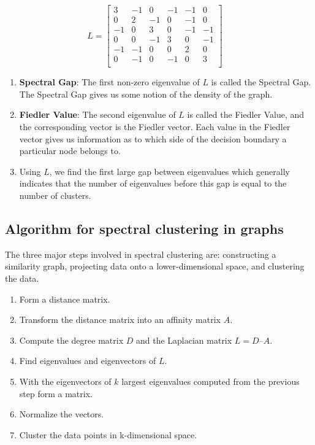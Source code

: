 \documentclass{article}
\begin{document}
        $$ L = 
    	\begin{bmatrix} 
    	3 & -1 & 0 & -1 & -1 & 0 \\
    	0 & 2 & -1 & 0 & -1 & 0 \\
    	-1 & 0 & 3 & 0 & -1 & -1 \\
     	0 & 0 & -1 & 3 & 0 & -1 \\
      	-1 & -1 & 0 & 0 & 2 & 0 \\
       	0 & -1 & 0 & -1 & 0 & 3 \\
    	\end{bmatrix}
    	\quad
        $$
        \begin{enumerate}
            \item \textbf{Spectral Gap}: The first non-zero eigenvalue of $L$ is called the Spectral Gap. The Spectral Gap gives us some notion of the density of the graph.
            \item \textbf{Fiedler Value}: The second eigenvalue of $L$ is called the Fiedler Value, and the corresponding vector is the Fiedler vector. Each value in the Fiedler vector gives us information as to which side of the decision boundary a particular node belongs to.
            \item Using $L$, we find the first large gap between eigenvalues which generally indicates that the number of eigenvalues before this gap is equal to the number of clusters.
        \end{enumerate}
    
    \subsection{Algorithm for spectral clustering in graphs}
    The three major steps involved in spectral clustering are: constructing a similarity graph, projecting data onto a lower-dimensional space, and clustering the data. 
        \begin{enumerate}[label=\textbf{Step \arabic*:}, wide=0pt, leftmargin=!, itemindent=2em]
            \item Form a distance matrix.
            \item Transform the distance matrix into an affinity matrix $A$.
            \item Compute the degree matrix $D$ and the Laplacian matrix $L = D – A$.
            \item Find eigenvalues and eigenvectors of $L$.
            \item With the eigenvectors of $k$ largest eigenvalues computed from the previous step form a matrix.
            \item Normalize the vectors.
            \item Cluster the data points in k-dimensional space.
        \end{enumerate}
    
\end{document}

